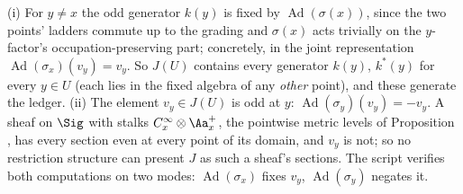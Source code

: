 (i) For $y \neq x$ the odd generator $k(y)$ is fixed by $\operatorname{Ad}(\sigma(x))$, since the two points' ladders commute up to the grading and $\sigma(x)$ acts trivially on the $y$-factor's occupation-preserving part; concretely, in the joint representation $\operatorname{Ad}(\sigma_x)(v_y) = v_y$. So $J(U)$ contains every generator $k(y)$, $k^{*}(y)$ for every $y \in U$ (each lies in the fixed algebra of any \emph{other} point), and these generate the ledger. (ii) The element $v_y \in J(U)$ is odd at $y$: $\operatorname{Ad}(\sigma_y)(v_y) = -v_y$. A sheaf on $\Sig$ with stalks $C^\infty_x \otimes \Aa_x^{+}$, the pointwise metric levels of Proposition , has every section even at every point of its domain, and $v_y$ is not; so no restriction structure can present $J$ as such a sheaf's sections. The script verifies both computations on two modes: $\operatorname{Ad}(\sigma_x)$ fixes $v_y$, $\operatorname{Ad}(\sigma_y)$ negates it.

